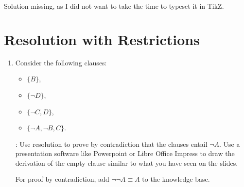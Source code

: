 \documentclass[solution]{acAssignment}
\begin{document}
\begin{acSolution}
    Solution missing, as I did not want to take the time to typeset it in TikZ.
\end{acSolution}

\section{Resolution with Restrictions}

\begin{enumerate}
    \item Consider the following clauses:
        
        \begin{itemize}
            \item $\{B\}$,
            \item $\{\lnot D\}$,
            \item $\{\lnot C, D\}$,
            \item $\{\lnot A, \lnot B, C\}$.
        \end{itemize}
        
        :
        Use resolution to prove by contradiction that the clauses entail $\lnot A$.
        Use a presentation software like Powerpoint or Libre Office Impress to draw the derivation of the empty clause similar to what you have seen on the slides.
        
        \begin{acSolution}
            For proof by contradiction, add $\lnot \lnot A \equiv A$ to the knowledge base.
            
            \begin{center}
            \end{center}
        \end{acSolution}
    

\end{enumerate}
\end{document}
